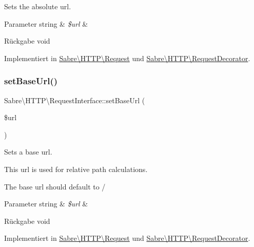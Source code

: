 Sets the absolute url.


\begin{DoxyParams}[1]{Parameter}
string & {\em \$url} & \\
\hline
\end{DoxyParams}
\begin{DoxyReturn}{Rückgabe}
void 
\end{DoxyReturn}


Implementiert in \mbox{\hyperlink{class_sabre_1_1_h_t_t_p_1_1_request_a4dd2d55f5c3a458c113bbb499a92c6ae}{Sabre\textbackslash{}\+H\+T\+T\+P\textbackslash{}\+Request}} und \mbox{\hyperlink{class_sabre_1_1_h_t_t_p_1_1_request_decorator_ad3a68a47dd02e6e338ce03dac1dc409a}{Sabre\textbackslash{}\+H\+T\+T\+P\textbackslash{}\+Request\+Decorator}}.

\mbox{\label{interface_sabre_1_1_h_t_t_p_1_1_request_interface_a1666fb35c3bad57838f187bf40105be4}} 
\subsubsection{\texorpdfstring{set\+Base\+Url()}{setBaseUrl()}}
{\footnotesize\ttfamily Sabre\textbackslash{}\+H\+T\+T\+P\textbackslash{}\+Request\+Interface\+::set\+Base\+Url (\begin{DoxyParamCaption}\item[{}]{\$url }\end{DoxyParamCaption})}

Sets a base url.

This url is used for relative path calculations.

The base url should default to /


\begin{DoxyParams}[1]{Parameter}
string & {\em \$url} & \\
\hline
\end{DoxyParams}
\begin{DoxyReturn}{Rückgabe}
void 
\end{DoxyReturn}


Implementiert in \mbox{\hyperlink{class_sabre_1_1_h_t_t_p_1_1_request_afe2e7926b168b37dceec5b19668f1fb9}{Sabre\textbackslash{}\+H\+T\+T\+P\textbackslash{}\+Request}} und \mbox{\hyperlink{class_sabre_1_1_h_t_t_p_1_1_request_decorator_ade9d2cb79ced7689675d480ffe5cf781}{Sabre\textbackslash{}\+H\+T\+T\+P\textbackslash{}\+Request\+Decorator}}.

